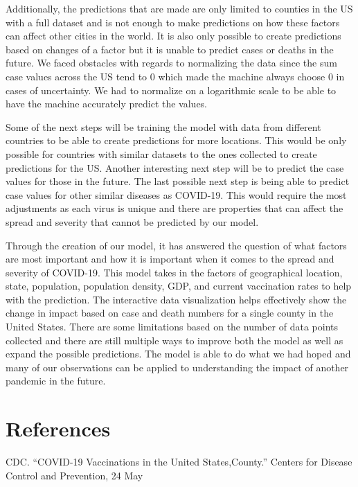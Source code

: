 \documentclass[fontsize=11pt]{article}
\begin{document}
    Additionally, the predictions that are made are only limited to counties in the US with a full dataset and is not enough to make predictions on how these factors can affect other cities in the world. It is also only possible to create predictions based on changes of a factor but it is unable to predict cases or deaths in the future. We faced obstacles with regards to normalizing the data since the sum case values across the US tend to 0 which made the machine always choose 0 in cases of uncertainty. We had to normalize on a logarithmic scale to be able to have the machine accurately predict the values. \par
    
    Some of the next steps will be training the model with data from different countries to be able to create predictions for more locations. This would be only possible for countries with similar datasets to the ones collected to create predictions for the US. Another interesting next step will be to predict the case values for those in the future. The last possible next step is being able to predict case values for other similar diseases as COVID-19. This would require the most adjustments as each virus is unique and there are properties that can affect the spread and severity that cannot be predicted by our model. \par
    
    Through the creation of our model, it has answered the question of what factors are most important and how it is important when it comes to the spread and severity of COVID-19. This model takes in the factors of geographical location, state, population, population density, GDP, and current vaccination rates to help with the prediction. The interactive data visualization helps effectively show the change in impact based on case and death numbers for a single county in the United States. There are some limitations based on the number of data points collected and there are still multiple ways to improve both the model as well as expand the possible predictions. The model is able to do what we had hoped and many of our observations can be applied to understanding the impact of another pandemic in the future. \par

    \section*{References}

    CDC. “COVID-19 Vaccinations in the United States,County.” Centers for Disease Control and Prevention, 24 May
    
\end{document}
